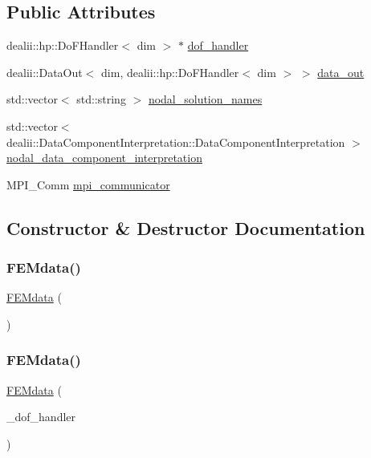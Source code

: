 \subsection*{Public Attributes}
\begin{DoxyCompactItemize}
\item 
dealii\+::hp\+::\+Do\+F\+Handler$<$ dim $>$ $\ast$ \mbox{\hyperlink{class_f_e_mdata_a38887e3bbeaa16b46355ba99d22e8063}{dof\+\_\+handler}}
\item 
dealii\+::\+Data\+Out$<$ dim, dealii\+::hp\+::\+Do\+F\+Handler$<$ dim $>$ $>$ \mbox{\hyperlink{class_f_e_mdata_ab8d2ee01f13a0a7b7d2dd50edabbe8b6}{data\+\_\+out}}
\item 
std\+::vector$<$ std\+::string $>$ \mbox{\hyperlink{class_f_e_mdata_a7b00177ad21830fe46a5bf4b1b4a3ea5}{nodal\+\_\+solution\+\_\+names}}
\item 
std\+::vector$<$ dealii\+::\+Data\+Component\+Interpretation\+::\+Data\+Component\+Interpretation $>$ \mbox{\hyperlink{class_f_e_mdata_a42965751ff10a28b5add7c0bfa265cee}{nodal\+\_\+data\+\_\+component\+\_\+interpretation}}
\item 
M\+P\+I\+\_\+\+Comm \mbox{\hyperlink{class_f_e_mdata_a03728ed636ca889ae407c84d181bc611}{mpi\+\_\+communicator}}
\end{DoxyCompactItemize}


\subsection{Constructor \& Destructor Documentation}
\mbox{\label{class_f_e_mdata_abb8edbdb28fbec855696a4a02648ad2d}} 
\subsubsection{\texorpdfstring{F\+E\+Mdata()}{FEMdata()}\hspace{0.1cm}{\footnotesize\ttfamily [1/2]}}
{\footnotesize\ttfamily \mbox{\hyperlink{class_f_e_mdata}{F\+E\+Mdata}} (\begin{DoxyParamCaption}{ }\end{DoxyParamCaption})}

\mbox{\label{class_f_e_mdata_ada690a46b4cec06866ffa32ca2e07c07}} 
\subsubsection{\texorpdfstring{F\+E\+Mdata()}{FEMdata()}\hspace{0.1cm}{\footnotesize\ttfamily [2/2]}}
{\footnotesize\ttfamily \mbox{\hyperlink{class_f_e_mdata}{F\+E\+Mdata}} (\begin{DoxyParamCaption}\item[{dealii\+::hp\+::\+Do\+F\+Handler$<$ dim $>$ \&}]{\+\_\+dof\+\_\+handler }\end{DoxyParamCaption})}

